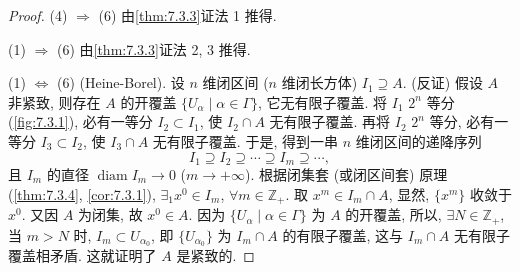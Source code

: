 \begin{proof}
(4) $\Rightarrow$ (6) 由\cref{thm:7.3.3}证法 1 推得.

(1) $\Rightarrow$ (6) 由\cref{thm:7.3.3}证法 2, 3 推得.

(1) $\Leftrightarrow$ (6) (Heine-Borel). 设 $n$ 维闭区间 ($n$ 维闭长方体) $I_{1} \supseteq A$. (反证) 假设 $A$ 非紧致, 则存在 $A$ 的开覆盖 $\{U_{\alpha} \mid \alpha \in \Gamma\}$, 它无有限子覆盖. 将 $I_{1}$ $2^{n}$ 等分 (\cref{fig:7.3.1}), 必有一等分 $I_{2} \subset I_{1}$, 使 $I_{2} \cap A$ 无有限子覆盖. 再将 $I_{2}$ $2^{n}$ 等分, 必有一等分 $I_{3} \subset I_{2}$, 使 $I_{3} \cap A$ 无有限子覆盖. 于是, 得到一串 $n$ 维闭区间的递降序列
\[
  I_{1} \supseteq I_{2} \supseteq \cdots \supseteq I_{m} \supseteq \cdots,
\]
且 $I_{m}$ 的直径 $\operatorname{diam} I_{m} \to 0$ ($m \to +\infty$). 根据闭集套 (或闭区间套) 原理 (\cref{thm:7.3.4}, \cref{cor:7.3.1}), $\exists_{1} x^{0} \in I_{m}$, $\forall m \in \mathbb{Z}_{+}$. 取 $x^{m} \in I_{m} \cap A$, 显然, $\{x^{m}\}$ 收敛于 $x^{0}$. 又因 $A$ 为闭集, 故 $x^{0} \in A$. 因为 $\{U_{\alpha} \mid \alpha \in \Gamma\}$ 为 $A$ 的开覆盖, 所以, $\exists N \in \mathbb{Z}_{+}$, 当 $m > N$ 时, $I_{m} \subset U_{\alpha_{0}}$, 即 $\{U_{\alpha_{0}}\}$ 为 $I_{m} \cap A$ 的有限子覆盖, 这与 $I_{m} \cap A$ 无有限子覆盖相矛盾. 这就证明了 $A$ 是紧致的.
\end{proof}

